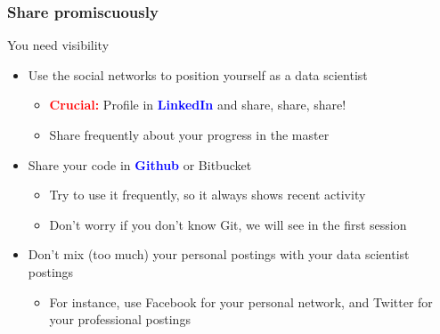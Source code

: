 \documentclass[11pt,xcolor=svgnames]{beamer}
\begin{document}
\begin{frame}\frametitle{Share promiscuously}
  \begin{block}{You need visibility}
    \begin{itemize}
    \item Use the social networks to position yourself as a data
      scientist
      \begin{itemize}
      \item \textcolor{red}{\bf Crucial:} Profile in
        \textcolor{blue}{\bf LinkedIn} and share, share, share!
      \item Share frequently about your progress in the master
      \end{itemize}
    \item Share your code in \textcolor{blue}{\bf Github} or Bitbucket
      \begin{itemize}
      \item Try to use it frequently, so it always shows recent
        activity
      \item Don't worry if you don't know Git, we will see in the
        first session
      \end{itemize}
    \item Don't mix (too much) your personal postings with your data
      scientist postings
      \begin{itemize}
      \item For instance, use Facebook for your personal network, and
        Twitter for your professional postings
      \end{itemize}
    \end{itemize}
  \end{block}
\end{frame}


\end{document}
